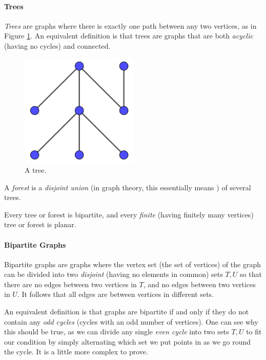 	\paragraph{Trees}
	
	\textit{Trees} are graphs where there is exactly one path between any two vertices, as in Figure \ref{treegraph}. An equivalent definition is that trees are graphs that are both \textit{acyclic} (having no cycles) and connected.
	
	\begin{figure}[h]
		\centering
		\includegraphics[width=0.5\textwidth]{treegraph}
		\caption{A tree.}
		\label{treegraph}
	\end{figure}
	
	A \textit{forest} is a \textit{disjoint union} (in graph theory, this essentially means ) of several trees.
	
	Every tree or forest is bipartite\footnotemark[\ref{definedlater}], and every \textit{finite} (having finitely many vertices) tree or forest is planar\footnotemark[\ref{definedlater}].
	
	\paragraph{Bipartite Graphs}
	
	Bipartite graphs are graphs where the vertex set (the set of vertices) of the graph can be divided into two \textit{disjoint} (having no elements in common) sets \(T,U\) so that there are no edges between two vertices in \(T\), and no edges between two vertices in \(U\). It follows that all edges are between vertices in different sets.
	
	An equivalent definition is that graphs are bipartite if and only if they do not contain any \textit{odd cycles} (cycles with an odd number of vertices). One can see why this should be true, as we can divide any single \textit{even cycle} into two sets \(T,U\) to fit our condition by simply alternating which set we put points in as we go round the cycle. It is a little more complex to prove.
	
